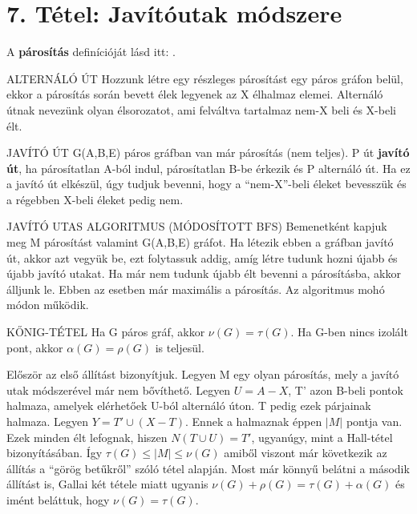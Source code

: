 \section{7. Tétel: Javítóutak módszere}

A \textbf{párosítás} definícióját lásd itt: .

\begin{definicio}{ALTERNÁLÓ ÚT}
Hozzunk létre egy részleges párosítást egy páros gráfon belül, ekkor a párosítás során bevett élek legyenek az X élhalmaz elemei. Alternáló útnak nevezünk olyan élsorozatot, ami felváltva tartalmaz nem-X beli és X-beli élt.
\end{definicio}

\begin{definicio}{JAVÍTÓ ÚT}
G(A,B,E) páros gráfban van már párosítás (nem teljes). P út \textbf{javító út}, ha párosítatlan A-ból indul, párosítatlan B-be érkezik és P alternáló út. Ha ez a javító út elkészül, úgy tudjuk bevenni, hogy a ``nem-X''-beli éleket bevesszük és a régebben X-beli éleket pedig nem.
\end{definicio}

\begin{definicio}{JAVÍTÓ UTAS ALGORITMUS (MÓDOSÍTOTT BFS)}
Bemenetként kapjuk meg M párosítást valamint G(A,B,E) gráfot. Ha létezik ebben a gráfban javító út, akkor azt vegyük be, ezt folytassuk addig, amíg létre tudunk hozni újabb és újabb javító utakat. Ha már nem tudunk újabb élt bevenni a párosításba, akkor álljunk le. Ebben az esetben már maximális a párosítás. Az algoritmus mohó módon működik.
\end{definicio}

\begin{tetel}{KŐNIG-TÉTEL}
Ha G páros gráf, akkor $\nu(G) = \tau(G)$. Ha G-ben nincs izolált pont, akkor $\alpha(G) = \rho(G)$ is teljesül.
\end{tetel}

\begin{bizonyitas}{}
Először az első állítást bizonyítjuk. Legyen M egy olyan párosítás, mely a javító utak módszerével már nem bővíthető. Legyen $U = A - X$, T' azon B-beli pontok halmaza, amelyek elérhetőek U-ból alternáló úton. T pedig ezek párjainak halmaza. Legyen $Y = T' \cup (X - T)$. Ennek a halmaznak éppen $|M|$ pontja van. Ezek minden élt lefognak, hiszen $N(T\cup U) = T'$, ugyanúgy, mint a Hall-tétel bizonyításában. Így $\tau(G) \leq |M| \leq \nu(G)$ amiből viszont már következik az állítás a ``görög betűkről'' szóló tétel alapján. Most már könnyű belátni a második állítást is, Gallai két tétele miatt ugyanis $\nu(G) + \rho(G) = \tau(G) + \alpha(G)$ és imént beláttuk, hogy $\nu(G) = \tau(G)$.
\end{bizonyitas}

